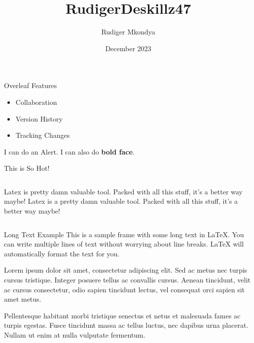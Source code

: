 \documentclass[14pt,aspectratio=169]{beamer}
\title{RudigerDeskillz47}
\author{Rudiger Mkondya}
\date{December 2023}
\begin{document}
\maketitle

\begin{frame}{Overleaf Features}
\begin{itemize}
    \item<1-> Collaboration
    \item<2-> Version History
    \item<3-> Tracking Changes
\end{itemize}


I can do an \alert<1>{Alert}. I can also do \textbf<2>{bold face}.
    
\end{frame}

\begin{frame}{This is So Hot!}
  \begin{columns}
       Latex is pretty damn valuable tool. Packed with all this stuff, it's a better way maybe!
       Latex is a pretty damn valuable tool. Packed with all this stuff, it's a better way maybe!
  \end{columns}
\end{frame}

\begin{frame}{Long Text Example}
    This is a sample frame with some long text in LaTeX. You can write multiple lines of text without worrying about line breaks. LaTeX will automatically format the text for you.

    \bigskip

    Lorem ipsum dolor sit amet, consectetur adipiscing elit. Sed ac metus nec turpis cursus tristique. Integer posuere tellus ac convallis cursus. Aenean tincidunt, velit ac cursus consectetur, odio sapien tincidunt lectus, vel consequat orci sapien sit amet metus.

    \bigskip

    Pellentesque habitant morbi tristique senectus et netus et malesuada fames ac turpis egestas. Fusce tincidunt massa ac tellus luctus, nec dapibus urna placerat. Nullam ut enim at nulla vulputate fermentum.
\end{frame}
\end{document}

